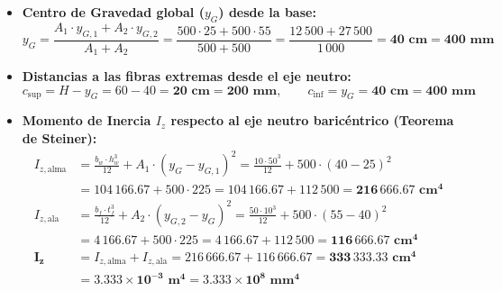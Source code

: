 {    \begin{itemize}
        \item \textbf{Centro de Gravedad global ($y_G$) desde la base:}
              \begin{equation}
                  y_G = \frac{A_1 \cdot y_{G,1} + A_2 \cdot y_{G,2}}{A_1 + A_2} = \frac{500 \cdot 25 + 500 \cdot 55}{500 + 500} = \frac{12\,500 + 27\,500}{1\,000} = \mathbf{40\text{ cm} = 400\text{ mm}}
              \end{equation}
        \item \textbf{Distancias a las fibras extremas desde el eje neutro:}
              \begin{equation}
                  c_{\text{sup}} = H - y_G = 60 - 40 = \mathbf{20\text{ cm} = 200\text{ mm}}, \qquad c_{\text{inf}} = y_G = \mathbf{40\text{ cm} = 400\text{ mm}}
              \end{equation}
        \item \textbf{Momento de Inercia $I_z$ respecto al eje neutro baricéntrico (Teorema de Steiner):}
              \begin{align}
                  I_{z,\text{alma}} & = \frac{b_w \cdot h_w^3}{12} + A_1 \cdot (y_G - y_{G,1})^2 = \frac{10 \cdot 50^3}{12} + 500 \cdot (40 - 25)^2 \nonumber \\
                                   & = 104\,166.67 + 500 \cdot 225 = 104\,166.67 + 112\,500 = \mathbf{216\,666.67\text{ cm}^4}                       \\
                  I_{z,\text{ala}}  & = \frac{b_f \cdot t_f^3}{12} + A_2 \cdot (y_{G,2} - y_G)^2 = \frac{50 \cdot 10^3}{12} + 500 \cdot (55 - 40)^2 \nonumber \\
                                   & = 4\,166.67 + 500 \cdot 225 = 4\,166.67 + 112\,500 = \mathbf{116\,666.67\text{ cm}^4}                           \\
                  \mathbf{I_z}     & = I_{z,\text{alma}} + I_{z,\text{ala}} = 216\,666.67 + 116\,666.67 = \mathbf{333\,333.33\text{ cm}^4} \nonumber \\
                                   & = \mathbf{3.333 \times 10^{-3}\text{ m}^4 = 3.333 \times 10^8\text{ mm}^4}
              \end{align}
    \end{itemize}


}
